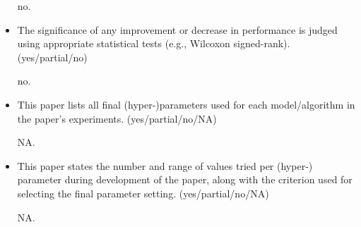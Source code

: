 \begin{itemize}
no.

\item The significance of any improvement or decrease in performance is judged using appropriate statistical tests (e.g., Wilcoxon signed-rank). (yes/partial/no)

no.

\item This paper lists all final (hyper-)parameters used for each model/algorithm in the paper’s experiments. (yes/partial/no/NA)

NA.

\item This paper states the number and range of values tried per (hyper-) parameter during development of the paper, along with the criterion used for selecting the final parameter setting. (yes/partial/no/NA)

NA.

\end{itemize}
